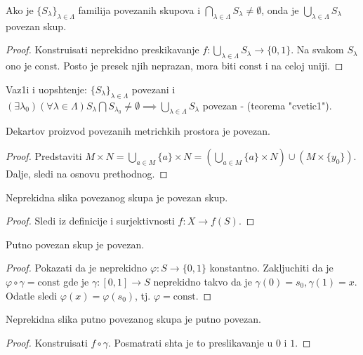 \documentclass[a4paper,12pt]{article}
\newcommand{\const}{\mathrm{const}}
\begin{document}
\begin{tvr}
Ako je $\{S_{\lambda}\}_{\lambda \in \Lambda}$ familija povezanih skupova i $\bigcap_{\lambda \in \Lambda} S_{\lambda} \ne \emptyset$, onda je $\bigcup_{\lambda \in \Lambda} S_{\lambda}$ povezan skup.
\end{tvr}
\begin{proof}
Konstruisati neprekidno preskikavanje $f: \bigcup_{\lambda \in \Lambda} S_{\lambda} \to \{ 0, 1 \}$. Na svakom $S_\lambda$ ono je $\const$. Posto je presek njih neprazan, mora biti $\const$ i na celoj uniji.
\end{proof}

\begin{nap}
Vaz1i i uopshtenje: $\{S_{\lambda}\}_{\lambda \in \Lambda}$ povezani i $(\exists \lambda_0) (\forall \lambda \in \Lambda) S_{\lambda} \bigcap S_{\lambda_0} \ne \emptyset \implies \bigcup_{\lambda \in \Lambda} S_{\lambda}$ povezan - (teorema "cvetic1").
\end{nap}

\begin{posl}
Dekartov proizvod povezanih metrichkih prostora je povezan.
\end{posl}
\begin{proof}
Predstaviti $M \times N = \bigcup_{a\in M} \{a\} \times N = (\bigcup_{a\in M} \{a\} \times N) \cup
(M \times  \{y_0\})$. Dalje, sledi na osnovu prethodnog.
\end{proof}

\begin{tvr}
Neprekidna slika povezanog skupa je povezan skup.
\end{tvr}
\begin{proof}
Sledi iz definicije i surjektivnosti $f: X \to f(S)$.
\end{proof}

\begin{tvr}
Putno povezan skup je povezan.
\end{tvr}
\begin{proof}
Pokazati da je neprekidno $\varphi: S \to \{0,1\}$ konstantno. Zakljuchiti da je $\varphi \circ \gamma = \const$ gde je $\gamma:[0,1] \to S$ neprekidno takvo da je $\gamma(0) = s_0, \gamma(1) = x$. Odatle sledi $\varphi(x) = \varphi(s_0)$, tj. $\varphi = \const$.
\end{proof}

\begin{tvr}
Neprekidna slika putno povezanog skupa je putno povezan.
\end{tvr}
\begin{proof}
Konstruisati $f \circ \gamma$. Posmatrati shta je to preslikavanje u $0$ i $1$.
\end{proof}
\end{document}

